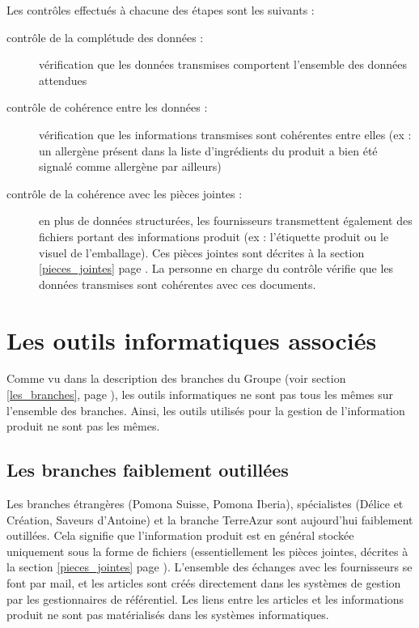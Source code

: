             Les contrôles effectués à chacune des étapes sont les suivants : 
            \begin{description}
                \item[contrôle de la complétude des données :] vérification que les données transmises comportent l'ensemble des données attendues
                \item[contrôle de cohérence entre les données :] vérification que les informations transmises sont cohérentes entre elles (ex : un allergène présent dans la liste d'ingrédients du produit a bien été signalé comme allergène par ailleurs)
                \item[contrôle de la cohérence avec les pièces jointes :] en plus de données structurées, les fournisseurs transmettent également des fichiers portant des informations produit (ex : l'étiquette produit ou le visuel de l'emballage). Ces pièces jointes sont décrites à la section \ref{pieces_jointes} page \pageref{pieces_jointes}. La personne en charge du contrôle vérifie que les données transmises sont cohérentes avec ces documents.
            \end{description}

        \section{Les outils informatiques associés}
        \label{outils_infos}

        Comme vu dans la description des branches du Groupe (voir section \ref{les_branches}, page \pageref{les_branches}), les outils informatiques ne sont pas tous les mêmes sur l'ensemble des branches.
        Ainsi, les outils utilisés pour la gestion de l'information produit ne sont pas les mêmes.

            \subsection{Les branches faiblement outillées}
            
            Les branches étrangères (Pomona Suisse, Pomona Iberia), spécialistes (Délice et Création, Saveurs d'Antoine) et la branche TerreAzur sont aujourd'hui faiblement outillées.
            Cela signifie que l'information produit est en général stockée uniquement sous la forme de fichiers (essentiellement les pièces jointes, décrites à la section \ref{pieces_jointes} page \pageref{pieces_jointes}).
            L'ensemble des échanges avec les fournisseurs se font par mail, et les articles sont créés directement dans les systèmes de gestion par les gestionnaires de référentiel.
            Les liens entre les articles et les informations produit ne sont pas matérialisés dans les systèmes informatiques.

